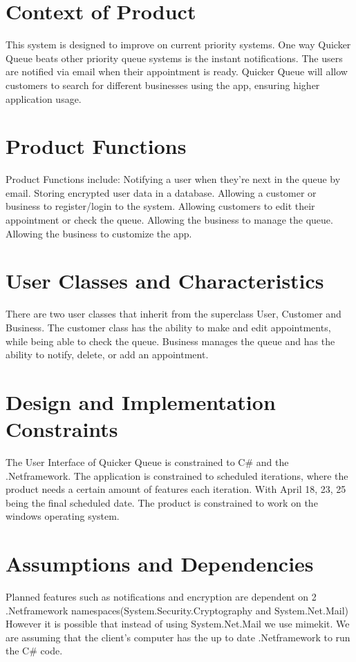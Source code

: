 \documentclass{scrreprt}
\begin{document}
\section{Context of Product}
This system is designed to improve on current priority systems. One way Quicker Queue beats other priority queue systems is the instant notifications.
The users are notified via email when their appointment is ready. Quicker Queue will allow customers to search for different businesses using the app, ensuring higher application usage.\\

\section{Product Functions}
Product Functions include: Notifying a user when they're next in the queue by email. Storing encrypted user data in a database. Allowing a customer or business to register/login to the system. Allowing customers to edit their appointment or check the queue. Allowing the business to manage the queue. Allowing the business to customize the app.

\section{User Classes and Characteristics}
There are two user classes that inherit from the superclass User, Customer and Business. The customer class has the ability to make and edit appointments, while being able to check the queue.
Business manages the queue and has the ability to notify, delete, or add an appointment.

\section{Design and Implementation Constraints}
The User Interface of Quicker Queue is constrained to C\# and the .Netframework. The application is constrained to scheduled iterations, where the product needs a certain amount of features each iteration.
With April 18, 23, 25 being the final scheduled date. The product is constrained to work on the windows operating system.
\section{Assumptions and Dependencies}

Planned features such as notifications and encryption are dependent on 2 .Netframework namespaces(System.Security.Cryptography and System.Net.Mail) However it is possible that instead of using System.Net.Mail we use mimekit.
We are assuming that the client's computer has the up to date .Netframework to run the C\# code.
\end{document}

